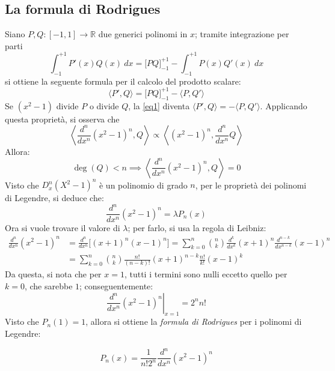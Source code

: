 \documentclass[11pt, a4paper]{scrartcl}
\theoremstyle{definition}
\numberwithin{esempio}{section}
\theoremstyle{definition}
\numberwithin{obs}{section}
\numberwithin{nota}{section}
\newenvironment{boxenv}[1][]{
    \begin{eqbox}[#1]
    }{
   \end{eqbox}
}
\newcommand*\Eval[3]{\left.#1\right\rvert_{#2}^{#3}}
\numberwithin{equation}{subsection}
\begin{document}
\subsection{La formula di Rodrigues}
Siano $P,Q : \left[ -1,1 \right] \to \mathbb{R}$ due generici polinomi in $x$; tramite integrazione per parti
\[
\int_{-1} ^{+1} P'(x) Q(x) \ dx = \big[PQ\big]_{-1} ^{+1} - \int_{-1} ^{+1} P(x) Q'(x) \ dx
\] 
si ottiene la seguente formula per il calcolo del prodotto scalare:
\begin{equation}\label{eq1}
	\langle P' , Q \rangle = \big[PQ\big]_{-1} ^{+1} - \langle P,Q' \rangle
\end{equation}
Se $(x^2 - 1 )$ divide $P$ o divide $Q$, la \ref{eq1} diventa $\langle P' , Q \rangle =  - \langle P,Q' \rangle$.
Applicando questa propriet\`a, si osserva che
\[
\left\langle \frac{d ^n}{d x^n} (x^2 - 1)^n, Q \right\rangle \propto \left\langle (x^2-1)^n , \frac{d ^n}{d x^n} Q \right\rangle
\] 
Allora:
\begin{equation}
	\operatorname{deg} (Q) < n \implies \left\langle \frac{d ^n}{d x^n} (x^2-1)^n,Q \right\rangle=0
\end{equation}
Visto che $D^n_x (X^2-1)^n$ \`e un polinomio di grado $n$, per le propriet\`a dei polinomi di Legendre, si deduce che:
\begin{equation}
	\frac{d ^n}{d x^n} (x^2-1)^n = \lambda P_n(x)
\end{equation}
Ora si vuole trovare il valore di $\lambda $; per farlo, si usa la regola di Leibniz:
\[
	\begin{split}
		\frac{d ^n}{d x^n} (x^2-1)^n &= \frac{d ^n}{d x^n} \Big[(x+1)^n (x-1)^n\Big] = \sum_{k=0}^{n} \binom{n}{k} \frac{d ^k}{d x^k}(x+1)^n \frac{d ^{n-k} }{d x^{n-k} } (x-1)^n\\
					     &=\sum_{k=0}^{n} \binom{n}{k} \frac{n!}{(n-k)!} (x+1)^{n-k} \frac{n!}{k!}(x-1)^k
	\end{split}
\] 
Da questa, si nota che per $x=1$, tutti i termini sono nulli eccetto quello per $k=0$, che sarebbe $1$; conseguentemente:
\[
	\Eval{\frac{d ^n}{d x^n} (x^2-1)^n}{x=1}{} = 2^n n!
\] 
Visto che $P_n(1) = 1$, allora si ottiene la \textit{formula di Rodrigues} per i polinomi di Legendre:
\begin{boxenv}[]
\begin{equation}
	P_n(x) = \frac{1}{n!2^n }\frac{d ^n}{d x^n} (x^2-1)^n
\end{equation}
\end{boxenv}
\end{document}

